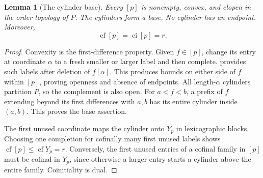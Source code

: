 \documentclass[11pt]{article}
\newtheorem{lemma}[lemma]{Lemma}
\theoremstyle{definition}
\theoremstyle{remark}
\newcommand{\cf}{\operatorname{cf}}
\newcommand{\ci}{\operatorname{ci}}
\begin{document}
\begin{lemma}[The cylinder base]\label{swo:gs:lem:cylinder-base}
Every $[p]$ is nonempty, convex, and clopen in the order topology of $P$.
The cylinders form a base. No cylinder has an endpoint. Moreover,
\[
 \cf[p]=\ci[p]=r.
\]
\end{lemma}
\begin{proof}
Convexity is the first-difference property. Given $f\in[p]$, change its
entry at coordinate $\alpha$ to a fresh smaller or larger label and then
complete.  provides such labels after deletion
of $f[\alpha]$. This produces bounds on either side of $f$ within $[p]$,
proving openness and absence of endpoints. All length-$\alpha$ cylinders
partition $P$, so the complement is also open. For $a<f<b$, a prefix of
$f$ extending beyond its first differences with $a,b$ has its entire
cylinder inside $(a,b)$. This proves the base assertion.

The first unused coordinate maps the cylinder onto $Y_p$ in lexicographic
blocks. Choosing one completion for cofinally many first unused labels
shows $\cf[p]\le\cf Y_p=r$. Conversely, the first unused entries of a
cofinal family in $[p]$ must be cofinal in $Y_p$, since otherwise a larger
entry starts a cylinder above the entire family. Coinitiality is dual.
\end{proof}
\end{document}
